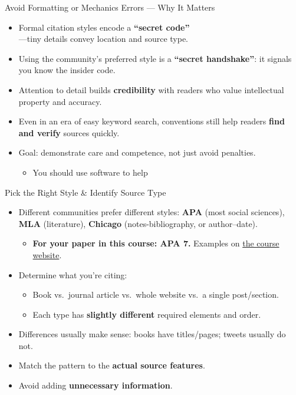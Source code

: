 \documentclass[aspectratio=169]{beamer}
\begin{document}
\begin{frame}{Avoid Formatting or Mechanics Errors — Why It Matters}
\begin{itemize}
\item Formal citation styles encode a \textbf{“secret code”}
  \\ —tiny details convey location and source type.
  \item Using the community’s preferred style is a \textbf{“secret handshake”}: it signals you know the insider code.
  \item Attention to detail builds \textbf{credibility} with readers who value intellectual property and accuracy.
  \item Even in an era of easy keyword search, conventions still help readers \textbf{find and verify} sources quickly.
  \item Goal: demonstrate care and competence, not just avoid penalties.
    \begin{itemize}
    \item You should use software to help
    \end{itemize}
\end{itemize}
\end{frame}

\begin{frame}{Pick the Right Style \& Identify Source Type}
\begin{itemize}
  \item Different communities prefer different styles: \textbf{APA} (most
    social sciences), \textbf{MLA} (literature), \textbf{Chicago}
    (notes-bibliography, or author--date).
    \begin{itemize}
    \item \textbf{For your paper in this course: APA 7.}  Examples on
      \href{https://bond-lab.github.io/Open-Knowledge/}{the course website}.
    \end{itemize}
  \item Determine what you’re citing:
    \begin{itemize}
      \item Book vs.\ journal article vs.\ whole website vs.\ a single post/section.
      \item Each type has \textbf{slightly different} required elements and order.
    \end{itemize}
  \item Differences usually make sense: books have titles/pages; tweets usually do not.
  \item Match the pattern to the \textbf{actual source features}.
  \item Avoid adding \textbf{unnecessary information}.
\end{itemize}
\end{frame}
\end{document}
